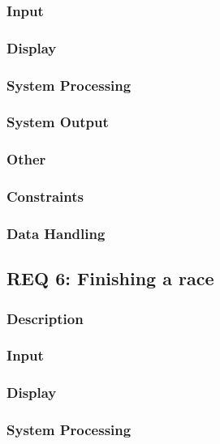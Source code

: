 \documentclass[a4paper, 11pt]{article} %
\begin{document}
\subsubsection{Input}

\subsubsection{Display}

\subsubsection{System Processing}

\subsubsection{System Output}

\subsubsection{Other}

\subsubsection{Constraints}

\subsubsection{Data Handling}

\newpage

\subsection{REQ 6: Finishing a race}

\subsubsection{Description}

\subsubsection{Input}

\subsubsection{Display}

\subsubsection{System Processing}
\end{document}
